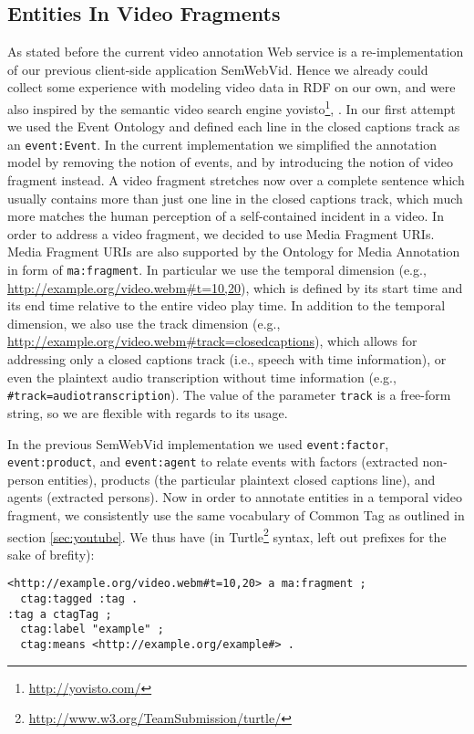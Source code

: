 \documentclass{acm_proc_article-sp}
\begin{document}
\subsection{Entities In Video Fragments}
As stated before the current video annotation Web service is a re-implementation of our previous client-side application SemWebVid\cite{Steiner:SemWebVid}. Hence we already could collect some experience with modeling video data in RDF on our own, and were also inspired by the semantic video search engine yovisto\footnote{\url{http://yovisto.com/}}\cite{Sack:Use}, \cite{Sack:VideoSearch}. In our first attempt we used the Event Ontology\cite{Raimond:Event} and defined each line in the closed captions track as an \texttt{event:Event}. In the current implementation we simplified the annotation model by removing the notion of events, and by introducing the notion of video fragment instead. A video fragment stretches now over a complete sentence which usually contains more than just one line in the closed captions track, which much more matches the human perception of a self-contained incident in a video. In order to address a video fragment, we decided to use Media Fragment URIs\cite{W3C:MediaFrags}. Media Fragment URIs are also supported by the Ontology for Media Annotation in form of \texttt{ma:fragment}. In particular we use the temporal dimension (e.g., \url{http://example.org/video.webm#t=10,20}), which is defined by its start time and its end time relative to the entire video play time. In addition to the temporal dimension, we also use the track dimension (e.g., \url{http://example.org/video.webm#track=closedcaptions}), which allows for addressing only a closed captions track (i.e., speech with time information), or even the plaintext audio transcription without time information (e.g., \texttt{\#track=audiotranscription}). The value of the parameter \texttt{track} is a free-form string, so we are flexible with regards to its usage.

In the previous SemWebVid implementation we used \texttt{event:factor}, \texttt{event:product}, and \texttt{event:agent} to relate events with factors (extracted non-person entities), products (the particular plaintext closed captions line), and agents (extracted persons). Now in order to annotate entities in a temporal video fragment, we consistently use the same vocabulary of Common Tag as outlined in section \ref{sec:youtube}. We thus have (in Turtle\footnote{\url{http://www.w3.org/TeamSubmission/turtle/}} syntax, left out prefixes for the sake of brefity):
\begin{verbatim}
<http://example.org/video.webm#t=10,20> a ma:fragment ;
  ctag:tagged :tag .
:tag a ctagTag ;
  ctag:label "example" ;
  ctag:means <http://example.org/example#> .
\end{verbatim}
\end{document}
